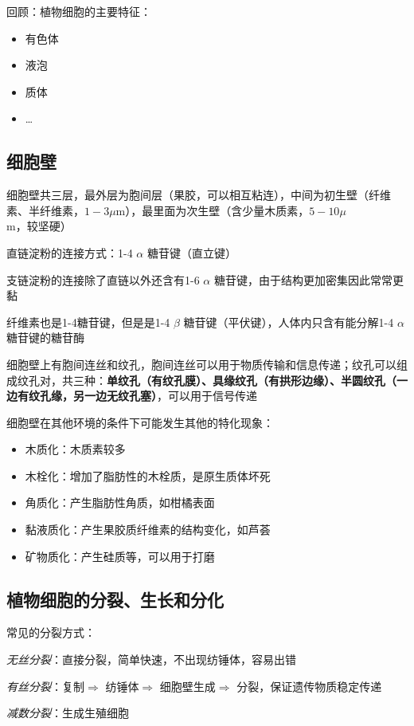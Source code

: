 回顾：植物细胞的主要特征：
\begin{itemize}
    \item 有色体
    \item 液泡
    \item 质体
    \item \ldots 
    
\end{itemize}
\subsection{细胞壁}%
\label{sub:细胞壁}
细胞壁共三层，最外层为胞间层（果胶，可以相互粘连），中间为初生壁（纤维素、半纤维素，$1-3\mu$m），最里面为次生壁（含少量木质素，$5-10\mu$m，较坚硬）
\begin{notation}
    直链淀粉的连接方式：1-4 $\alpha$ 糖苷键（直立键）

    支链淀粉的连接除了直链以外还含有1-6 $\alpha$ 糖苷键，由于结构更加密集因此常常更黏

    纤维素也是1-4糖苷键，但是是1-4 $\beta$ 糖苷键（平伏键），人体内只含有能分解1-4 $\alpha$ 糖苷键的糖苷酶
\end{notation}
细胞壁上有胞间连丝和纹孔，胞间连丝可以用于物质传输和信息传递；纹孔可以组成纹孔对，共三种：\textbf{单纹孔（有纹孔膜）、具缘纹孔（有拱形边缘）、半圆纹孔（一边有纹孔缘，另一边无纹孔塞）}，可以用于信号传递

细胞壁在其他环境的条件下可能发生其他的特化现象：
\begin{itemize}
    \item 木质化：木质素较多
    \item 木栓化：增加了脂肪性的木栓质，是原生质体坏死
    \item 角质化：产生脂肪性角质，如柑橘表面
    \item 黏液质化：产生果胶质纤维素的结构变化，如芦荟
    \item 矿物质化：产生硅质等，可以用于打磨
\end{itemize}
\subsection{植物细胞的分裂、生长和分化}%
\label{sub:植物细胞的分裂、生长和分化}
常见的分裂方式：

\textit{无丝分裂}：直接分裂，简单快速，不出现纺锤体，容易出错

\textit{有丝分裂}：复制$\Rightarrow $ 纺锤体$\Rightarrow $ 细胞壁生成$\Rightarrow $ 分裂，保证遗传物质稳定传递

\textit{减数分裂}：生成生殖细胞
